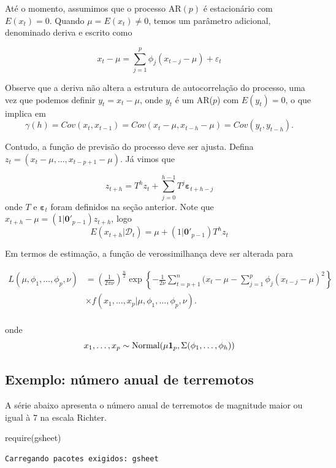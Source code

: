 \documentclass[
  letterpaper,
  DIV=11,
  numbers=noendperiod]{scrartcl}
\newenvironment{Shaded}{\begin{snugshade}}{\end{snugshade}}
\newcommand{\FunctionTok}[1]{\textcolor[rgb]{0.28,0.35,0.67}{#1}}
\newcommand{\NormalTok}[1]{\textcolor[rgb]{0.00,0.23,0.31}{#1}}
\theoremstyle{plain}
\theoremstyle{plain}
\theoremstyle{definition}
\theoremstyle{definition}
\theoremstyle{remark}
\begin{document}
Até o momento, assumimos que o processo AR\((p)\) é estacionário com
\(E(x_t)=0\). Quando \(\mu=E(x_t)\neq 0\), temos um parâmetro adicional,
denominado deriva e escrito como

\[x_t-\mu=\sum_{j=1}^p \phi_j(x_{t-j}-\mu)+\varepsilon_t\]

Observe que a deriva não altera a estrutura de autocorrelação do
processo, uma vez que podemos definir \(y_t=x_t-\mu\), onde \(y_t\) é um
AR(\(p\)) com \(E(y_t)=0\), o que implica em
\[\gamma(h)=Cov(x_t, x_{t-1})=Cov(x_t-\mu,x_{t-h}-\mu)=Cov(y_t,y_{t-h}).\]

Contudo, a função de previsão do processo deve ser ajusta. Defina
\(z_t=(x_t-\mu,\ldots,x_{t-p+1}-\mu)\). Já vimos que

\[z_{t+h}=T^h z_t+\sum_{j=0}^{h-1}T^j\boldsymbol{\varepsilon}_{t+h-j}\]
onde \(T\) e \(\boldsymbol{\varepsilon}_t\) foram definidos na seção
anterior. Note que \(x_{t+h}-\mu=(1|\textbf{0}'_{p-1})z_{t+h}\), logo
\[E(x_{t+h}|\mathcal{D}_t)=\mu+(1|\textbf{0}'_{p-1})T^h z_t\]

Em termos de estimação, a função de verossimilhança deve ser alterada
para

\[\begin{align*}
L(\mu,\phi_1,\ldots,\phi_p,\nu)&=\left(\frac{1}{2\pi\nu}\right)^{\frac{n}{2}}\exp\left\{-\frac{1}{2\nu}\sum_{t=p+1}^n(x_t-\mu-\sum_{j=1}^p \phi_j(x_{t-j}-\mu)^2\right\} \\&\times f(x_{1},\ldots,x_p|\mu,\phi_1,\ldots,\phi_p,\nu).
        \end{align*}\]\\
onde
\[x_{1},\ldots,x_p\sim\hbox{Normal}(\mu\textbf{1}_p,\Sigma(\phi_1,\ldots,\phi_h))\]

\hypertarget{exemplo-nuxfamero-anual-de-terremotos}{%
\subsection{Exemplo: número anual de
terremotos}\label{exemplo-nuxfamero-anual-de-terremotos}}

A série abaixo apresenta o número anual de terremotos de magnitude maior
ou igual à 7 na escala Richter.

\begin{Shaded}
\begin{Highlighting}[]
\FunctionTok{require}\NormalTok{(gsheet)}
\end{Highlighting}
\end{Shaded}

\begin{verbatim}
Carregando pacotes exigidos: gsheet
\end{verbatim}
\end{document}
